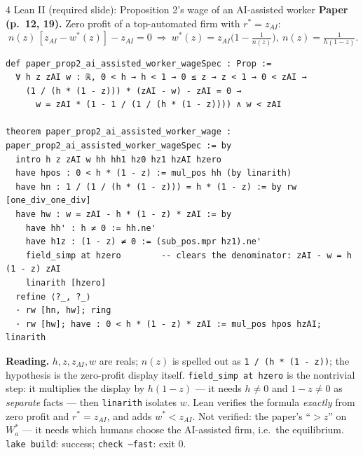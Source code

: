 \documentclass[aspectratio=169,11pt]{beamer}
\begin{document}
\begin{frame}[fragile]{4 \textperiodcentered{} Lean II (required slide): Proposition 2's wage of an AI-assisted worker}
  \scriptsize
  \textbf{Paper (p.\ 12, 19).} Zero profit of a top-automated firm with $r^*=z_{AI}$:
  $\;n(z)\,[z_{AI}-w^*(z)]-z_{AI}=0\ \Rightarrow\ w^*(z)=z_{AI}\big(1-\tfrac1{n(z)}\big),\ n(z)=\tfrac{1}{h(1-z)}$.
  \vspace{-2pt}
  \begin{lstlisting}[basicstyle=\ttfamily\tiny]
def paper_prop2_ai_assisted_worker_wageSpec : Prop :=
  ∀ h z zAI w : ℝ, 0 < h → h < 1 → 0 ≤ z → z < 1 → 0 < zAI →
    (1 / (h * (1 - z))) * (zAI - w) - zAI = 0 →
      w = zAI * (1 - 1 / (1 / (h * (1 - z)))) ∧ w < zAI

theorem paper_prop2_ai_assisted_worker_wage : paper_prop2_ai_assisted_worker_wageSpec := by
  intro h z zAI w hh hh1 hz0 hz1 hzAI hzero
  have hpos : 0 < h * (1 - z) := mul_pos hh (by linarith)
  have hn : 1 / (1 / (h * (1 - z))) = h * (1 - z) := by rw [one_div_one_div]
  have hw : w = zAI - h * (1 - z) * zAI := by
    have hh' : h ≠ 0 := hh.ne'
    have h1z : (1 - z) ≠ 0 := (sub_pos.mpr hz1).ne'
    field_simp at hzero        -- clears the denominator: zAI - w = h (1 - z) zAI
    linarith [hzero]
  refine ⟨?_, ?_⟩
  · rw [hn, hw]; ring
  · rw [hw]; have : 0 < h * (1 - z) * zAI := mul_pos hpos hzAI; linarith
  \end{lstlisting}
  \vspace{-4pt}
  \textbf{Reading.} $h,z,z_{AI},w$ are reals; $n(z)$ is spelled out as \texttt{1 / (h * (1 - z))}; the hypothesis is
  the zero-profit display itself. \texttt{field\_simp at hzero} is the nontrivial step: it multiplies the display by
  $h(1-z)$ --- it needs $h\neq0$ and $1-z\neq0$ as \emph{separate} facts --- then \texttt{linarith} isolates $w$.
  Lean verifies the formula \emph{exactly} from zero profit and
  $r^*=z_{AI}$, and adds $w^*<z_{AI}$. Not verified: the paper's ``$>z$'' on $W^*_a$ --- it needs which humans choose
  the AI-assisted firm, i.e.\ the equilibrium. \texttt{lake build}: success; \texttt{check --fast}: exit 0.
\end{frame}
\end{document}
